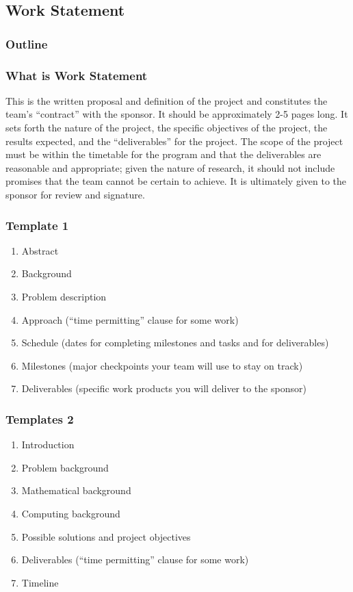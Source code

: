 \subsection{Work Statement}

\begin{frame}
    \frametitle{Outline}
\end{frame}

\begin{frame}
    \frametitle{What is Work Statement}
This is the written proposal and definition of the project and constitutes the
team's ``contract'' with the sponsor. It should be approximately 2-5 pages
long.  It sets forth the nature of the project, the specific
objectives of the project, the results expected, and the ``deliverables'' for
the project. The scope of the project must be within the timetable for the
program and that the deliverables are reasonable and appropriate; given the
nature of research, it should not include promises that the team cannot be
certain to achieve. It is ultimately given to the sponsor for review and
signature.
\end{frame}


\begin{frame}
    \frametitle{Template 1}
    \begin{enumerate}
        \item Abstract
        \item Background
        \item Problem description
        \item Approach (``time permitting'' clause for some work)
        \item Schedule (dates for completing milestones and tasks and for
            deliverables)
        \item Milestones (major checkpoints your team will use to stay on
            track)
        \item Deliverables (specific work products you will deliver to the
            sponsor)
    \end{enumerate}
\end{frame}

\begin{frame}
    \frametitle{Templates 2}
    \begin{enumerate}
        \item Introduction
        \item Problem background
        \item Mathematical background
        \item Computing background 
        \item Possible solutions and project objectives
        \item Deliverables (``time permitting'' clause for some work)
        \item Timeline
    \end{enumerate}
\end{frame}

